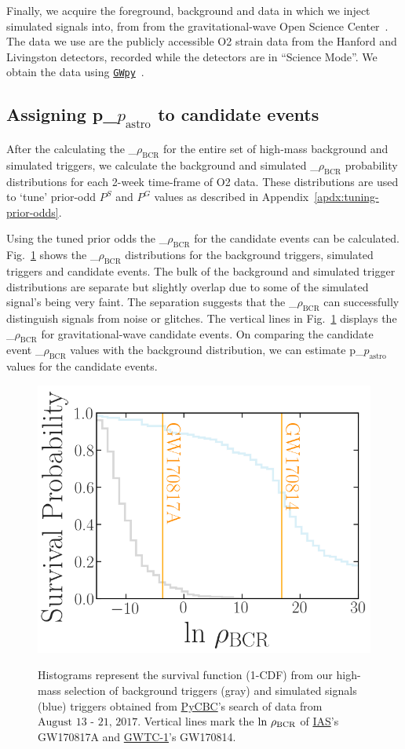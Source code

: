 \documentclass[%
 nofootinbib,
 amsmath,amssymb,
 aps,
 twocolumn,
 superscriptaddress
]{revtex4-2}
\newcommand{\gwpy}{{\sc \href{https://gwpy.github.io/}{\texttt{GWpy}}}\xspace}
\newcommand{\pycbc}{{\sc \href{https://pycbc.org/}{{PyCBC}}}\xspace}
\newcommand{\GWTC}{{\sc \href{https://ui.adsabs.harvard.edu/abs/2019PhRvX...9c1040A/abstract}{{GWTC-1}}}\xspace}
\newcommand{\IAS}{{\sc \href{https://ui.adsabs.harvard.edu/abs/2020PhRvD.101h3030V/abstract}{{IAS}}}\xspace}
\newcommand{\fancytext}[1]{{\relax\ifmmode#1\else $#1$\fi}\xspace}
\newcommand{\mathcmd}[1]{{\sc \relax\ifmmode#1\else $#1$\fi}\xspace}
\newcommand{\bcr}{\mathcmd{\rho_\text{BCR}}}
\newcommand{\pastro}{\fancytext{p_\text{astro}}}
\begin{document}
Finally, we acquire the foreground, background and data in which we inject simulated signals into, from from the gravitational-wave Open Science Center~\cite{GWOSC}. The data we use are the publicly accessible O2 strain data from the Hanford and Livingston detectors, recorded while the detectors are in ``Science Mode''. We obtain the data using \gwpy~\cite{gwpy}. 

\subsection{Assigning \pastro to candidate events}
After the calculating the \bcr for the entire set of high-mass background and simulated triggers, we calculate the background and simulated \bcr probability distributions for each 2-week time-frame of O2 data. These distributions are used to `tune' prior-odd $P^S$ and $P^G$ values as described in Appendix~\ref{apdx:tuning-prior-odds}.

Using the tuned prior odds the \bcr for the candidate events can be calculated. Fig.~\ref{fig:bcrCdf} shows the \bcr distributions for the background triggers, simulated triggers and candidate events. The bulk of the background and simulated trigger distributions are separate but slightly overlap due to some of the simulated signal's being very faint. The separation suggests that the \bcr can successfully distinguish signals from noise or glitches. The vertical lines in Fig.~\ref{fig:bcrCdf} displays the \bcr for gravitational-wave candidate events. On comparing the candidate event \bcr values with the background distribution, we can estimate \pastro values for the candidate events. 

\begin{figure}[!ht]
{\centering \includegraphics[width=0.85\linewidth]{images/reweighted_bcr_cdf_smaller_legend.png} }
\caption[BCR distribution example]{Histograms represent the survival function (1-CDF) from our high-mass selection of background triggers (gray) and simulated signals (blue) triggers obtained from \pycbc's search of data from $\text{August 13 - 21, 2017}$. Vertical lines mark the $\text{ln}\ \bcr$ of \IAS's GW170817A and \GWTC's GW170814.}\label{fig:bcrCdf}
\end{figure}
\end{document}
